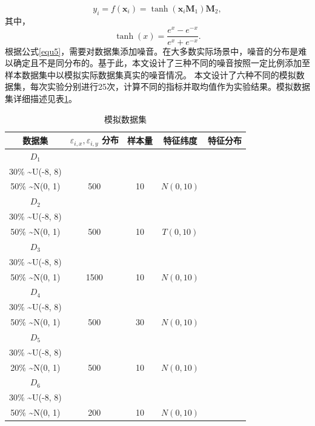 \documentclass{NauThesis}
\begin{document}
\begin{equation}
    y_i = f(\boldsymbol{x}_i) = \tanh(\boldsymbol{x}_i \boldsymbol{M}_1)\boldsymbol{M}_2,
\end{equation}
其中，
\begin{equation}
    \tanh(x) = \frac{e^x - e^{-x}}{e^x + e^{-x}}.
\end{equation}
\newpage
根据公式\eqref{equ5}，需要对数据集添加噪音。在大多数实际场景中，噪音的分布是难以确定且不是同分布的。基于此，本文设计了三种不同的噪音按照一定比例添加至样本数据集中以模拟实际数据集真实的噪音情况\cite{ref81}。
本文设计了六种不同的模拟数据集，每次实验分别进行25次，计算不同的指标并取均值作为实验结果。模拟数据集详细描述见表\ref{tab2}。

\begin{table}[ht]
    \centering
    \caption{模拟数据集}
    \begin{tabular}{ccccc}
    \toprule
    数据集 & \( \varepsilon_{i,x}, \varepsilon_{i,y} \) 分布 & 样本量 & 特征纬度 & 特征分布 \\
    \midrule
    \( D_1 \) & \( \begin{array}{l} 20\% \sim {N}(0, 64) \\ 30\% \sim {U}(-8, 8) \\ 50\% \sim {N}(0, 1) \end{array} \) & 500 & 10 & \( {N}(0, 10) \) \\
    \( D_2 \) & \( \begin{array}{l} 20\% \sim {N}(0, 64) \\ 30\% \sim {U}(-8, 8) \\ 50\% \sim {N}(0, 1) \end{array} \) & 500 & 10 & \( T(0, 10) \) \\
    \( D_3 \) & \( \begin{array}{l} 20\% \sim {N}(0, 64) \\ 30\% \sim {U}(-8, 8) \\ 50\% \sim {N}(0, 1) \end{array} \) & 1500 & 10 & \( {N}(0, 10) \) \\
    \( D_4 \) & \( \begin{array}{l} 20\% \sim {N}(0, 64) \\ 30\% \sim {U}(-8, 8) \\ 50\% \sim {N}(0, 1) \end{array} \) & 500 & 30 & \( {N}(0, 10) \) \\
    \( D_5 \) & \( \begin{array}{l} 50\% \sim {N}(0, 64) \\ 30\% \sim {U}(-8, 8) \\ 20\% \sim {N}(0, 1) \end{array} \) & 500 & 10 & \( {N}(0, 10) \) \\
    \( D_6 \) & \( \begin{array}{l} 20\% \sim {N}(0, 64) \\ 30\% \sim {U}(-8, 8) \\ 50\% \sim {N}(0, 1) \end{array} \) & 200 & 10 & \( {N}(0, 10) \) \\
    \bottomrule
    \end{tabular}
    \label{tab2}
\end{table}
\end{document}
